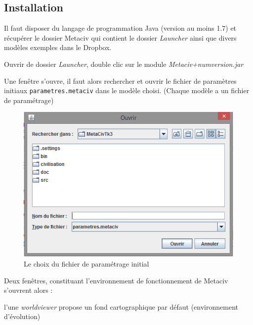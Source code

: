 \documentclass[a4paper,oneside,12 pt]{article}
\begin{document}
\subsection{Installation}

Il faut disposer du langage de programmation Java (version au moins 1.7) et récupérer le dossier Metaciv qui contient le dossier \textit{Launcher} ainsi que divers modèles exemples dans le Dropbox.

Ouvrir de dossier \textit{Launcher}, double clic sur le module \textit{Metaciv+numversion.jar}


Une fenêtre s'ouvre, il faut alors rechercher et ouvrir le fichier de paramètres initiaux  \texttt{parametres.metaciv} dans le modèle choisi. (Chaque modèle a un fichier de paramétrage)



\begin{figure}[hbtp]
\begin{center}
 \includegraphics [scale=0.4] {ecran1.png}
\end{center}
 \caption{Le choix du fichier de paramétrage initial}
\end{figure}


Deux fenêtres, constituant l'environnement de fonctionnement de Metaciv  s'ouvrent alors : 

l'une \textit{worldviewer} propose un fond cartographique par défaut (environnement d'évolution)
\end{document}
